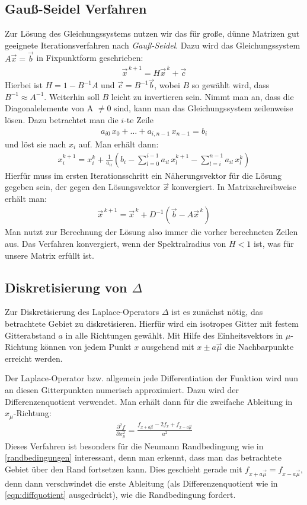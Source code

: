 \documentclass[10pt,a4paper]{article}
\begin{document}
\subsection{Gauß-Seidel Verfahren}
Zur Lösung des Gleichungssystems nutzen wir das für große, dünne Matrizen gut geeignete Iterationsverfahren nach \emph{Gauß-Seidel}. Dazu wird das Gleichungssystem $A\vec{x}=\vec{b}$ in Fixpunktform geschrieben:
\begin{align}
\vec{x}^{\,k+1}=H\vec{x}^{\,k}+\vec{c}
\end{align}
Hierbei ist $H=1-B^{-1}A$ und $\vec{c}=B^{-1}\vec{b}$, wobei $B$ so gewählt wird, dass $B^{-1}\approx A^{-1}$. Weiterhin soll $B$ leicht zu invertieren sein. Nimmt man an, dass die Diagonalelemente von A $\not=0$ sind, kann man das Gleichungssystem zeilenweise lösen. Dazu betrachtet man die $i$-te Zeile
\begin{align}
a_{i0}\,x_0+\dots+a_{i,n-1}\,x_{n-1}=b_i
\end{align}
und löst sie nach $x_i$ auf. Man erhält dann:
\begin{align}
x_i^{k+1}=x^k_i+\frac{1}{a_{ii}}\left( b_i-\sum_{l=0}^{i-1}a_{il}\,x_l^{k+1} - \sum_{l=i}^{n-1}a_{il}\,x_l^k\right)
\end{align}
Hierfür muss im ersten Iterationsschritt ein Näherungsvektor für die Lösung gegeben sein, der gegen den Lösungsvektor $\vec{x}$ konvergiert. In Matrixschreibweise erhält man:
\begin{align}
\vec{x}^{\,k+1}=\vec{x}^{\,k}+D^{-1}\left(\vec{b}-A\vec{x}^{\,k}\right)
\end{align}
Man nutzt zur Berechnung der Lösung also immer die vorher berechneten Zeilen aus. Das Verfahren konvergiert, wenn der Spektralradius von $H<1$ ist, was für unsere Matrix erfüllt ist.  

\subsection{Diskretisierung von $\Delta$}
Zur Diskretisierung des Laplace-Operators $\Delta$ ist es zunächst nötig, das betrachtete Gebiet zu diskretisieren. Hierfür wird ein isotropes Gitter mit festem Gitterabstand $a$ in alle Richtungen gewählt. Mit Hilfe des Einheitsvektors in $\mu$-Richtung können von jedem Punkt $x$ ausgehend mit $x\pm a\vec{\mu}$ die Nachbarpunkte erreicht werden.

Der Laplace-Operator bzw. allgemein jede Differentiation der Funktion wird nun an diesen Gitterpunkten numerisch approximiert. Dazu wird der Differenzenquotient verwendet. Man erhält dann für die zweifache Ableitung in $x_{\mu}$-Richtung:
\begin{align}
\frac{\partial^2f}{\partial x_{\mu}^2}=\frac{f_{x+a\vec{\mu}}-2 f_x+f_{x-a\vec{\mu}}}{a^2}
\label{eqn:diffquotient}
\end{align}
Dieses Verfahren ist besonders für die Neumann Randbedingung wie in  \ref{randbedingungen} interessant, denn man erkennt, dass man das betrachtete Gebiet über den Rand fortsetzen kann. Dies geschieht gerade mit $f_{x+a\vec{\mu}}=f_{x-a\vec{\mu}}$, denn dann verschwindet die erste Ableitung (als Differenzenquotient wie in \ref{eqn:diffquotient} ausgedrückt), wie die Randbedingung fordert.
\end{document}
